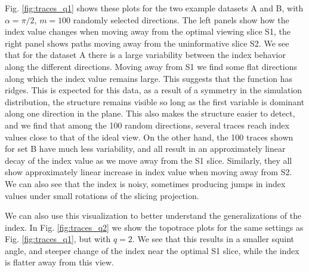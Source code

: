 \documentclass[]{interact}
\theoremstyle{plain}%
\theoremstyle{definition}
\theoremstyle{remark}
\begin{document}
Fig. \ref{fig:traces_q1} shows these plots for the two example datasets
A and B, with \(\alpha = \pi/2\), \(m=100\) randomly selected
directions. The left panels show how the index value changes when moving
away from the optimal viewing slice S1, the right panel shows paths
moving away from the uninformative slice S2. We see that for the dataset
A there is a large variability between the index behavior along the
different directions. Moving away from S1 we find some flat directions
along which the index value remains large. This suggests that the
function has ridges. This is expected for this data, as a result of a
symmetry in the simulation distribution, the structure remains visible
so long as the first variable is dominant along one direction in the
plane. This also makes the structure easier to detect, and we find that
among the 100 random directions, several traces reach index values close
to that of the ideal view. On the other hand, the 100 traces shown for
set B have much less variability, and all result in an approximately
linear decay of the index value as we move away from the S1 slice.
Similarly, they all show approximately linear increase in index value
when moving away from S2. We can also see that the index is noisy,
sometimes producing jumps in index values under small rotations of the
slicing projection.

We can also use this visualization to better understand the
generalizations of the index. In Fig. \ref{fig:traces_q2} we show the
topotrace plots for the same settings as Fig. \ref{fig:traces_q1}, but
with \(q=2\). We see that this results in a smaller squint angle, and
steeper change of the index near the optimal S1 slice, while the index
is flatter away from this view.
\end{document}
